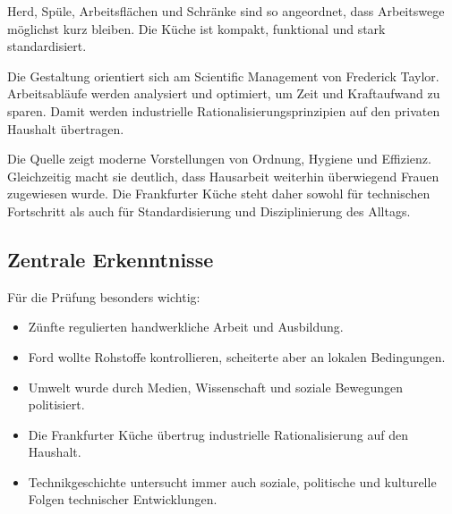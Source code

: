 Herd, Spüle, Arbeitsflächen und Schränke sind so angeordnet, dass Arbeitswege möglichst kurz bleiben. Die Küche ist kompakt, funktional und stark standardisiert.

Die Gestaltung orientiert sich am Scientific Management von Frederick Taylor. Arbeitsabläufe werden analysiert und optimiert, um Zeit und Kraftaufwand zu sparen. Damit werden industrielle Rationalisierungsprinzipien auf den privaten Haushalt übertragen.

Die Quelle zeigt moderne Vorstellungen von Ordnung, Hygiene und Effizienz. Gleichzeitig macht sie deutlich, dass Hausarbeit weiterhin überwiegend Frauen zugewiesen wurde. Die Frankfurter Küche steht daher sowohl für technischen Fortschritt als auch für Standardisierung und Disziplinierung des Alltags.

\subsection{Zentrale Erkenntnisse}

Für die Prüfung besonders wichtig:

\begin{itemize}
\item Zünfte regulierten handwerkliche Arbeit und Ausbildung.
\item Ford wollte Rohstoffe kontrollieren, scheiterte aber an lokalen Bedingungen.
\item Umwelt wurde durch Medien, Wissenschaft und soziale Bewegungen politisiert.
\item Die Frankfurter Küche übertrug industrielle Rationalisierung auf den Haushalt.
\item Technikgeschichte untersucht immer auch soziale, politische und kulturelle Folgen technischer Entwicklungen.
\end{itemize}
